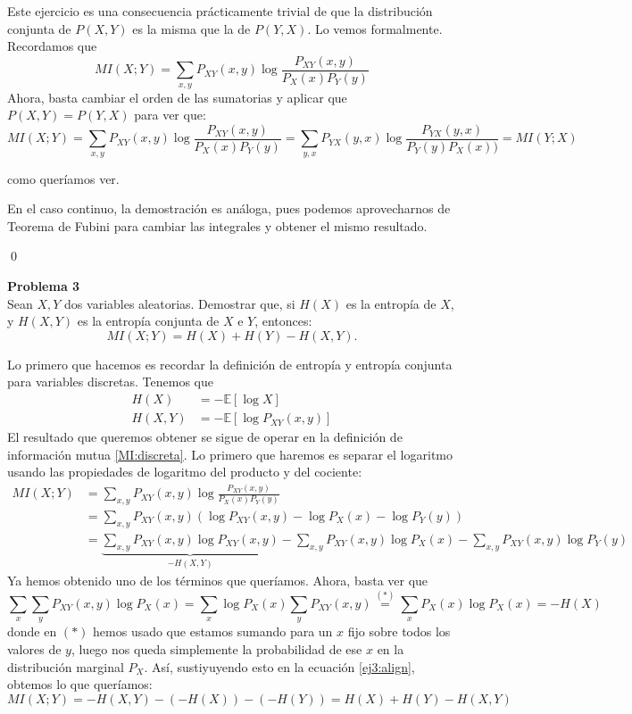 \documentclass[a4paper]{article}
\newenvironment{problem}[2][Problema]
    { \begin{mdframed}[backgroundcolor=gray!20] \textbf{#1 #2} \\}
    {  \end{mdframed}}
\begin{document}
Este ejercicio es una consecuencia prácticamente trivial de que la distribución conjunta de $P(X,Y)$ es la misma que la de $P(Y,X)$. Lo vemos formalmente. Recordamos que
\begin{equation}
  \label{MI:discreta}
MI(X;Y) = \sum_{x,y} P_{XY}(x,y) \log \frac{P_{XY}(x,y)}{P_X(x)P_Y(y)}
\end{equation}
Ahora, basta cambiar el orden de las sumatorias  y aplicar que $P(X,Y) = P(Y,X)$ para ver que:
\[
MI(X;Y) = \sum_{x,y} P_{XY}(x,y) \log \frac{P_{XY}(x,y)}{P_X(x)P_Y(y)} = \sum_{y,x} P_{YX}(y,x) \log \frac{P_{YX}(y,x)}{P_Y(y)P_X(x))} = MI(Y;X)
    \]

    como queríamos ver.

En el caso continuo, la demostración es análoga, pues podemos aprovecharnos de Teorema de Fubini para cambiar las integrales y obtener el mismo resultado.

\qed

\begin{problem}{3}

 Sean $X,Y$ dos variables aleatorias. Demostrar que, si $H(X)$ es la entropía de $X$, y $H(X,Y)$ es la entropía conjunta de $X$ e $Y$, entonces:
\[
MI(X;Y) = H(X) + H(Y) - H(X,Y).
\]
\end{problem}

Lo primero que hacemos es recordar la definición de entropía y entropía conjunta para variables discretas. Tenemos que
\begin{align}
  H(X) & = - \mathbb E \left[\log X\right] \label{entropia} \\
  H(X,Y) & = - \mathbb E \left[ \log P_{XY}(x,y)\right] \label{entropia:conjunta}
\end{align}
El resultado que queremos obtener se sigue de operar en la definición de información mutua \eqref{MI:discreta}. Lo primero que haremos es separar el logaritmo usando las propiedades de logaritmo del producto y del cociente:
\begin{align}
  MI(X;Y) &  = \sum_{x,y} P_{XY}(x,y) \log \frac{P_{XY}(x,y)}{P_X(x)P_Y(y)} \nonumber \\
  & = \sum_{x,y} P_{XY}(x,y) \left( \log P_{XY}(x,y) - \log P_X(x) - \log P_Y(y) \right)\nonumber \\
  & =  \underbrace{\sum_{x,y}P_{XY}(x,y) \log P_{XY}(x,y)}_{-H(X,Y)} - \sum_{x,y} P_{XY}(x,y) \log P_X(x) - \sum_{x,y} P_{XY}(x,y) \log P_Y(y) \label{ej3:align}
\end{align}
Ya hemos obtenido uno de los términos que queríamos. Ahora, basta ver que
\[
\sum_x \sum_y P_{XY}(x,y) \log P_X(x) = \sum_x \log P_X(x) \sum_y P_{XY}(x,y) \stackrel{(*)}{=} \sum_x P_X(x) \log P_X(x) = - H(X)
\]
donde en $(*)$ hemos usado que estamos sumando para un $x$ fijo sobre todos los valores de $y$, luego nos queda simplemente la probabilidad de ese $x$ en la distribución marginal $P_X$. Así, sustiyuyendo esto en la ecuación \eqref{ej3:align}, obtemos lo que queríamos:
$$
MI(X;Y) = -H(X,Y) - (- H(X)) - (-H(Y)) = H(X) + H(Y) - H(X,Y)
$$
\end{document}
